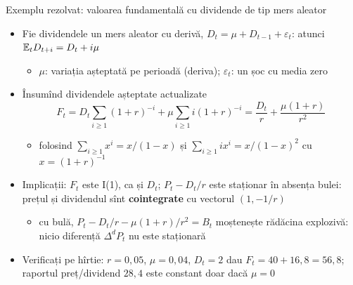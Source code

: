 \begin{frame}{Exemplu rezolvat: valoarea fundamentală cu dividende de tip mers aleator}
\itemsize{\small}
\begin{itemize}
    \item Fie dividendele un mers aleator cu derivă, $D_t = \mu + D_{t-1} + \varepsilon_t$: atunci $\mathbb{E}_t D_{t+i} = D_t + i\mu$
    \begin{itemize}
        \item $\mu$: variația așteptată pe perioadă (deriva); $\varepsilon_t$: un șoc cu media zero
    \end{itemize}
    \item Însumînd dividendele așteptate actualizate \[ F_t = D_t\sum_{i \ge 1}(1 + r)^{-i} + \mu\sum_{i \ge 1} i(1 + r)^{-i} = \dfrac{D_t}{r} + \dfrac{\mu(1 + r)}{r^2} \]
    \begin{itemize}
        \item folosind $\sum_{i \ge 1} x^i = x/(1 - x)$ și $\sum_{i \ge 1} i x^i = x/(1 - x)^2$ cu $x = (1 + r)^{-1}$
    \end{itemize}
    \item Implicații: $F_t$ este I(1), ca și $D_t$; $P_t - D_t/r$ este staționar în absența bulei: prețul și dividendul sînt \textbf{cointegrate} cu vectorul $(1, -1/r)$ 
    \begin{itemize}
        \item cu bulă, $P_t - D_t/r - \mu(1 + r)/r^2 = B_t$ moștenește rădăcina explozivă: nicio diferență $\Delta^d P_t$ nu este staționară 
    \end{itemize}
    \item Verificați pe hîrtie: $r = 0{,}05$, $\mu = 0{,}04$, $D_t = 2$ dau $F_t = 40 + 16{,}8 = 56{,}8$; raportul preț/dividend $28{,}4$ este constant doar dacă $\mu = 0$
\end{itemize}
\end{frame}

